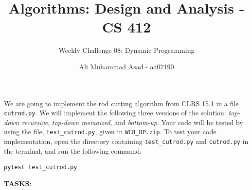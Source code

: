 \documentclass[addpoints]{exam}
\title{Algorithms: Design and Analysis - CS 412 \vspace*{-4mm}}
\author{Weekly Challenge 08: Dynamic Programming}
\date{\vspace*{-4mm} Ali Muhammad Asad - aa07190}
\begin{document}
\maketitle

\begin{questions}
    \question[1]
      We are going to implement the rod cutting algorithm from CLRS 15.1 in a file \texttt{cutrod.py}. We will implement the following three versions of the solution: \textit{top-down recursive}, \textit{top-down memoized}, and \textit{bottom-up}. Your code will be tested by  using the file, \texttt{test\_cutrod.py}, given in \texttt{WC8\_DP.zip}. To test your code implementation, open the directory containing \texttt{test\_cutrod.py} and \texttt{cutrod.py} in the terminal, and run the following command:
    \begin{lstlisting}[language=bash]
    pytest test_cutrod.py
\end{lstlisting}
      \textbf{TASKS}:
\end{questions}
\end{document}
